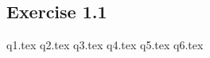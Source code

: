 \documentclass[fleqn]{article}
\begin{document}
    \subsection{Exercise 1.1}

    {q1.tex}
    {q2.tex}
    {q3.tex}
    {q4.tex}
    {q5.tex}
    {q6.tex}
\end{document}
